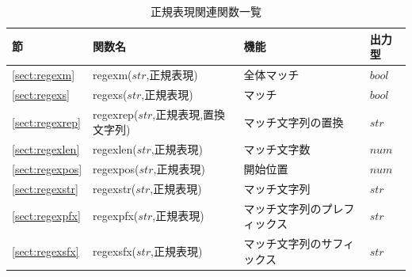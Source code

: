 \begin{table}[!hb]
\begin{center}
\caption{正規表現関連関数一覧\label{tbl:mcal_regex}}
{\small
  \begin{tabular}{l|l|l|l} \hline
節&関数名&機能&出力型\\ \hline

\ref{sect:regexm}& regexm($str$,正規表現)&
全体マッチ&
$bool$\\

\ref{sect:regexs}& regexs($str$,正規表現)&
マッチ&
$bool$\\


\ref{sect:regexrep}& regexrep($str$,正規表現,置換文字列)&
マッチ文字列の置換&$str$\\

\ref{sect:regexlen}& regexlen($str$,正規表現)&
マッチ文字数&
$num$\\

\ref{sect:regexpos}& regexpos($str$,正規表現)&
開始位置&
$num$\\

\ref{sect:regexstr}& regexstr($str$,正規表現)&
マッチ文字列&
$str$\\

\ref{sect:regexpfx}& regexpfx($str$,正規表現)&
マッチ文字列のプレフィックス&
$str$\\

\ref{sect:regexsfx}& regexsfx($str$,正規表現)&
マッチ文字列のサフィックス&
$str$\\
 
\hline
  \end{tabular}
  }
  \end{center}
\end{table}


